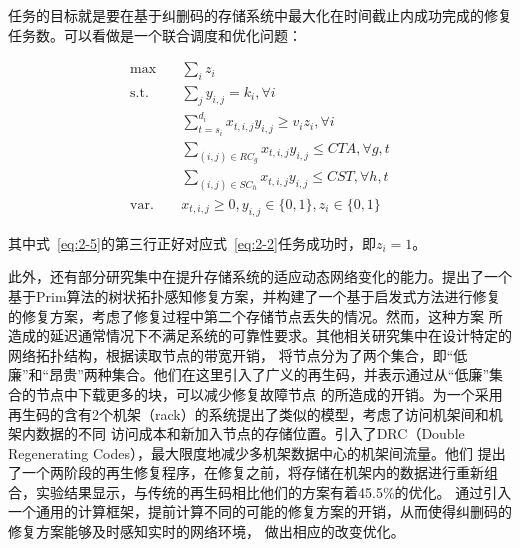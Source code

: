 任务的目标就是要在基于纠删码的存储系统中最大化在时间截止内成功完成的修复任务数。可以看做是一个联合调度和优化问题：

\begin{equation}
    \begin{aligned}
    \label{eq:2-5}
    \max \quad & \sum_{i} z_{i}  \\
    \mbox{s.t.} \quad & \sum_{j} y_{i, j}=k_{i}, \forall i \\
    & \sum_{t=s_{i}}^{d_{i}} x_{t, i, j} y_{i, j} \geq v_{i} z_{i}, \forall i \\
    & \sum_{(i, j) \in R C_{g}} x_{t, i, j} y_{i, j} \leq C T A, \forall g, t \\
    & \sum_{(i, j) \in S C_{h}} x_{t, i, j} y_{i, j} \leq C S T, \forall h, t \\
    \mbox{var.} \quad & x_{t, i, j} \geq 0, y_{i, j} \in\{0,1\}, z_{i} \in\{0,1\}
    \end{aligned}
\end{equation}

其中式~\ref{eq:2-5}的第三行正好对应式~\ref{eq:2-2}任务成功时，即$z_i=1$。


此外，还有部分研究集中在提升存储系统的适应动态网络变化的能力。\citet{li2010tree}提出了一个
基于Prim算法的树状拓扑感知修复方案，并构建了一个基于启发式方法进行修复的修复方案，考虑了修复过程中第二个存储节点丢失的情况。然而，这种方案
所造成的延迟通常情况下不满足系统的可靠性要求。其他相关研究集中在设计特定的网络拓扑结构，\citet{akhlaghi2010fundamental}根据读取节点的带宽开销，
将节点分为了两个集合，即“低廉”和“昂贵”两种集合。他们在这里引入了广义的再生码，并表示通过从“低廉”集合的节点中下载更多的块，可以减少修复故障节点
的所造成的开销。\citet{gaston2013realistic}为一个采用再生码的含有2个机架（rack）的系统提出了类似的模型，考虑了访问机架间和机架内数据的不同
访问成本和新加入节点的存储位置。\citet{hu2016double}引入了DRC（Double Regenerating Codes），最大限度地减少多机架数据中心的机架间流量。他们
提出了一个两阶段的再生修复程序，在修复之前，将存储在机架内的数据进行重新组合，实验结果显示，与传统的再生码相比他们的方案有着45.5\%的优化。
\citet{sipos2018network}通过引入一个通用的计算框架，提前计算不同的可能的修复方案的开销，从而使得纠删码的修复方案能够及时感知实时的网络环境，
做出相应的改变优化。

